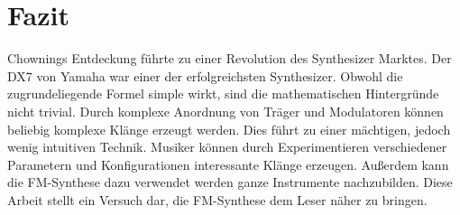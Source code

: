 \section{Fazit}

Chownings Entdeckung führte zu einer Revolution des Synthesizer Marktes. Der DX7 von Yamaha war einer der erfolgreichsten Synthesizer. Obwohl die zugrundeliegende Formel simple wirkt, sind die mathematischen Hintergründe nicht trivial. Durch komplexe Anordnung von Träger und Modulatoren können beliebig komplexe Klänge erzeugt werden. Dies führt zu einer mächtigen, jedoch wenig intuitiven Technik. Musiker können durch Experimentieren verschiedener Parametern und Konfigurationen interessante Klänge erzeugen. Außerdem kann die FM-Synthese dazu verwendet werden ganze Instrumente nachzubilden.
Diese Arbeit stellt ein Versuch dar, die FM-Synthese dem Leser näher zu bringen.